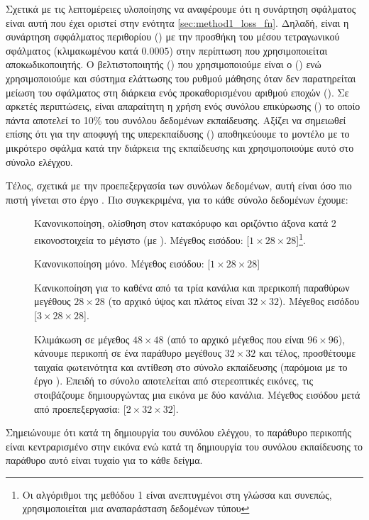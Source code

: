 Σχετικά με τις λεπτομέρειες υλοποίησης να αναφέρουμε ότι η συνάρτηση σφάλματος είναι αυτή που έχει οριστεί στην ενότητα \ref{sec:method1_loss_fn}. Δηλαδή, είναι η συνάρτηση σφφάλματος περιθορίου () με την προσθήκη του μέσου τετραγωνικού σφάλματος (κλιμακωμένου κατά $0.0005$) στην περίπτωση που χρησιμοποιείται αποκωδικοποιητής. Ο βελτιστοποιητής () που χρησιμοποιούμε είναι ο  () ενώ χρησιμοποιούμε και σύστημα ελάττωσης του ρυθμού μάθησης όταν δεν παρατηρείται μείωση του σφάλματος στη διάρκεια ενός προκαθορισμένου αριθμού εποχών (). Σε αρκετές περιπτώσεις, είναι απαραίτητη η χρήση ενός συνόλου επικύρωσης () το οποίο πάντα αποτελεί το 10\% του συνόλου δεδομένων εκπαίδευσης. Αξίζει να σημειωθεί επίσης ότι για την αποφυγή της υπερεκπαίδυσης () αποθηκεύουμε το μοντέλο με το μικρότερο σφάλμα κατά την διάρκεια της εκπαίδευσης και χρησιμοποιούμε αυτό στο σύνολο ελέγχου.\par

Τέλος, σχετικά με την προεπεξεργασία των συνόλων δεδομένων, αυτή είναι όσο πιο πιστή γίνεται στο έργο \cite{sabour2017dynamic}. Πιο συγκεκριμένα, για το κάθε σύνολο δεδομένων έχουμε:
\begin{description}
    \item[] Κανονικοποίηση, ολίσθηση στον κατακόρυφο και οριζόντιο άξονα κατά 2 εικονοστοιχεία το μέγιστο (με ). Μέγεθος εισόδου: [$1 \times 28 \times 28$]\footnote{Οι αλγόριθμοι της μεθόδου 1 είναι ανεπτυγμένοι στη γλώσσα  και συνεπώς, χρησιμοποιείται μια αναπαράσταση δεδομένων τύπου }.
    \item[] Κανονικοποίηση μόνο. Μέγεθος εισόδου: [$1 \times 28 \times 28$]
    \item[] Κανικοποίηση για το καθένα από τα τρία κανάλια και πρερικοπή παραθύρων μεγέθους $28 \times 28$ (το αρχικό ύψος και πλάτος είναι $32 \times 32$). Μέγεθος εισόδου [$3 \times 28 \times 28$].
    \item[] Κλιμάκωση σε μέγεθος $48 \times 48$ (από το αρχικό μέγεθος που είναι $96 \times 96$), κάνουμε περικοπή σε ένα παράθυρο μεγέθους $32 \times 32$ και τέλος, προσθέτουμε ταιχαία φωτεινότητα και αντίθεση στο σύνολο εκπαίδευσης (παρόμοια με το έργο \cite{hinton2018matrix}). Επειδή το σύνολο αποτελείται από στερεοπτικές εικόνες, τις στοιβάζουμε δημιουργώντας μια εικόνα με δύο κανάλια. Μέγεθος εισόδου μετά από προεπεξεργασία: [$2 \times 32 \times 32$].
\end{description} 
Σημειώνουμε ότι κατά τη δημιουργία του συνόλου ελέγχου, το παράθυρο περικοπής είναι κεντραρισμένο στην εικόνα ενώ κατά τη δημιουργία του συνόλου εκπαίδευσης το παράθυρο αυτό είναι τυχαίο για το κάθε δείγμα.

